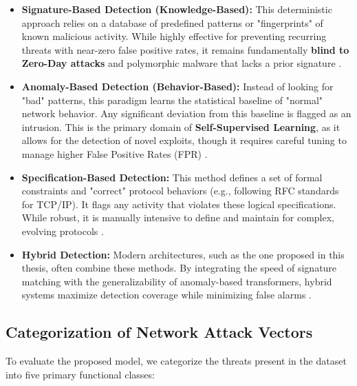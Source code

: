 \documentclass[12pt, a4paper]{report}
\begin{document}
\begin{itemize}
    \item \textbf{Signature-Based Detection (Knowledge-Based):} This deterministic approach relies on a database of predefined patterns or "fingerprints" of known malicious activity. While highly effective for preventing recurring threats with near-zero false positive rates, it remains fundamentally \textbf{blind to Zero-Day attacks} and polymorphic malware that lacks a prior signature .
    
    \item \textbf{Anomaly-Based Detection (Behavior-Based):} Instead of looking for "bad" patterns, this paradigm learns the statistical baseline of "normal" network behavior. Any significant deviation from this baseline is flagged as an intrusion. This is the primary domain of \textbf{Self-Supervised Learning}, as it allows for the detection of novel exploits, though it requires careful tuning to manage higher False Positive Rates (FPR) .
    
    \item \textbf{Specification-Based Detection:} This method defines a set of formal constraints and "correct" protocol behaviors (e.g., following RFC standards for TCP/IP). It flags any activity that violates these logical specifications. While robust, it is manually intensive to define and maintain for complex, evolving protocols .
    
    \item \textbf{Hybrid Detection:} Modern architectures, such as the one proposed in this thesis, often combine these methods. By integrating the speed of signature matching with the generalizability of anomaly-based transformers, hybrid systems maximize detection coverage while minimizing false alarms .
\end{itemize}

\subsection{Categorization of Network Attack Vectors}
To evaluate the proposed model, we categorize the threats present in the dataset into five primary functional classes:
\end{document}
